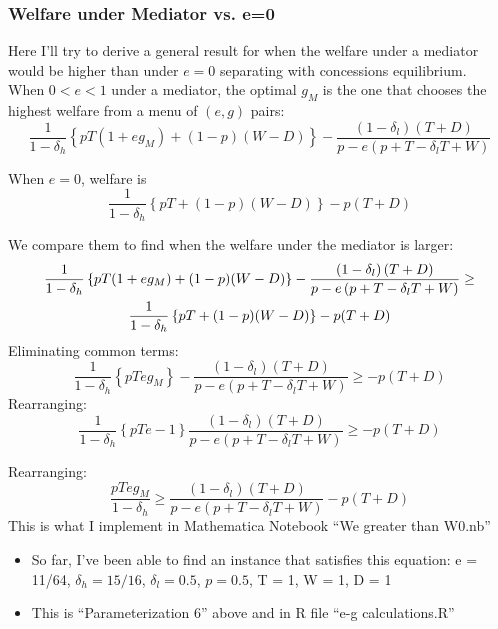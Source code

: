 \documentclass[12pt]{article}
\newcommand{\de}{\delta}
\begin{document}
\subsubsection{Welfare under Mediator vs. e=0}
\label{sec:WM0}
Here I'll try to derive a general result for when the welfare under a mediator would be higher than under $e=0$ separating with concessions equilibrium. \\

When $0<e<1$ under a mediator, the optimal $g_M$ is the one that chooses the highest welfare from a menu of $(e,g)$ pairs:
$$\frac{1}{1-\de_h}\left\{pT(1+eg_M) + (1-p)(W-D)\right\} - \frac{\left(1 - \de_l \right) \left( T + D \right)}{p - e \left( p + T - \de_l T + W \right)}$$

When $e=0$, welfare is $$\frac{1}{1-\de_h}\left\{pT + (1-p)(W-D)\right\} - p(T+D)$$

We compare them to find when the welfare under the mediator is larger:
	\begin{multline*}
		\frac{1}{1-\de_h}\left\{pT(1+eg_M) + (1-p)(W-D)\right\} - \frac{\left(1 - \de_l \right) \left( T + D \right)}{p - e \left( p + T - \de_l T + W \right)} \geq \\
		\frac{1}{1-\de_h}\left\{pT + (1-p)(W-D)\right\} - p(T+D)$$
	\end{multline*}							
Eliminating common terms:
	\begin{equation*}
		\frac{1}{1-\de_h}\left\{pTeg_M \right\} - \frac{\left(1 - \de_l \right) \left( T + D \right)}{p - e \left( p + T - \de_l T + W \right)} \geq - p(T+D)
	\end{equation*}	
Rearranging:
	\begin{equation*}
		\frac{1}{1-\de_h}\left\{pTe - 1 \right\} \frac{\left(1 - \de_l \right) \left( T + D \right)}{p - e \left( p + T - \de_l T + W \right)} \geq - p(T+D)
	\end{equation*}	

Rearranging:
\begin{equation*}
		\frac{pTeg_M}{1-\de_h} \geq \frac{\left(1 - \de_l \right) \left( T + D \right)}{p - e \left( p + T - \de_l T + W \right)} - p(T+D)
	\end{equation*}	
This is what I implement in Mathematica Notebook ``We greater than W0.nb''
\begin{itemize}
	\item So far, I've been able to find an instance that satisfies this equation: e = 11/64, $\de_h = 15/16$, $\de_l = 0.5$, $p = 0.5$, T = 1, W = 1, D = 1
	\item This is ``Parameterization 6'' above and in R file ``e-g calculations.R''
\end{itemize}
			
\end{document}
